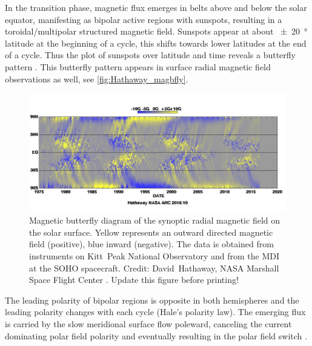 In the transition phase, magnetic flux emerges in belts above and below the solar equator, manifesting as bipolar active regions with sunspots, resulting in a toroidal/multipolar structured magnetic field. Sunspots appear at about \SI{+-20}{\degree} latitude at the beginning of a cycle, this shifts towards lower latitudes at the end of a cycle. Thus the plot of sunspots over latitude and time reveals a butterfly pattern \citep{Maunder1904}. This butterfly pattern appears in surface radial magnetic field observations as well, see \autoref{fig:Hathaway_magbfly}.
\begin{figure}[htb]
	\centering
	\includegraphics[width=\textwidth]{images/Hathaway_magbfly_201610.jpg}
	\caption{Magnetic butterfly diagram of the synoptic radial magnetic field on the solar surface. Yellow represents an outward directed magnetic field (positive), blue inward (negative). The data is obtained from instruments on Kitt~Peak National Observatory and from the MDI at the SOHO spacecraft. Credit: David~Hathaway, NASA Marshall Space Flight Center \citep[updated version of][Fig.~17]{Hathaway2015}. Update this figure before printing!}
	\label{fig:Hathaway_magbfly}
\end{figure}
The leading polarity of bipolar regions is opposite in both hemispheres and the leading polarity changes with each cycle (Hale's polarity law). The emerging flux is carried by the slow meridional surface flow poleward, canceling the current dominating polar field polarity and eventually resulting in the polar field switch \citep{Hathaway2015}.

